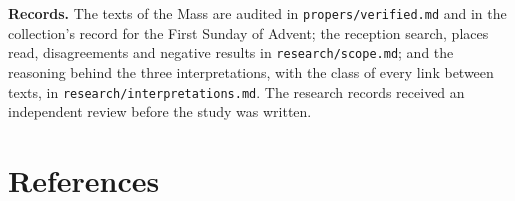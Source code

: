 {\textbf{Records.} The texts of the Mass are audited in
\texttt{propers/verified.md} and in the collection's record for the First
Sunday of Advent; the reception search, places read, disagreements and
negative results in \texttt{research/scope.md}; and the reasoning behind the
three interpretations, with the class of every link between texts, in
\texttt{research/interpretations.md}. The research records received an
independent review before the study was written.
\par}

\section*{References}
\label{sec:references}

